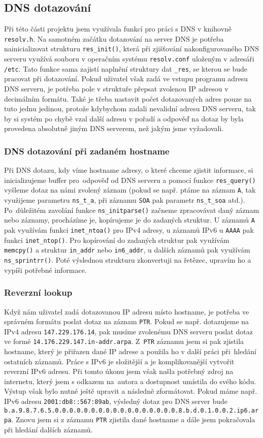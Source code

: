 \documentclass[a4paper, 11pt]{article}
\begin{document}
 \subsection{DNS dotazování}
 Při této části projektu jsem využívala funkcí pro práci s DNS v knihovně \verb|resolv.h|. Na samotném začátku dotazování na server DNS je potřeba nainicializovat strukturu \verb|res_init()|, která při zjišťování nakonfigurovaného DNS serveru využívá souboru v operačním systému \verb|resolv.conf| uloženým v adresáři \verb|/etc|. Tato funkce sama zajistí naplnění struktury dat \verb|_res|, se kterou se bude pracovat při dotazování. 
 Pokud uživatel však zadá ve vstupu programu adresu DNS serveru, je potřeba pole v struktuře přepsat zvolenou IP adresou v decimálním formátu. Také je třeba nastavit počet dotazovaných adres pouze na tuto jednu jedinou, protože kdybychom zadali nevalidní adresu DNS serveru, tak by si systém po chybě vzal další adresu v pořadí a odpověď na dotaz by byla provedena absolutně jiným DNS serverem, než jakým jsme vyžadovali.
 \subsubsection{DNS dotazování při zadaném hostname}
 Při DNS dotazu, kdy víme hostname adresy, o které chceme zjistit informace, si inicializujeme buffer pro~odpověď od DNS serveru a pomocí funkce \verb|res_query()| vyšleme dotaz na námi zvolený záznam (pokud se např. ptáme na záznam \verb|A|, tak využijeme parametru \verb|ns_t_a|, při záznamu \verb|SOA| pak parametr \verb|ns_t_soa| atd.). Po~důležitém zavolání funkce \verb|ns_initparse()| začneme zpracovávat daný záznam nebo záznamy, procházíme je, kopírujeme je do zadaných struktur. U záznamů \verb|A| pak využívám funkci \verb|inet_ntoa()| pro IPv4 adresy, u záznamů IPv6 u \verb|AAAA| pak funkci \verb|inet_ntop()|. Pro kopírování do zadaných struktur pak využívám \verb|memcpy()| a struktur \verb|in_addr| nebo \verb|in6_addr|, u dalších záznamů pak využívám \verb|ns_sprintrr()|. Poté výslednou strukturu zkonvertuji na řetězec, upravím ho a vypíši potřebné informace.
  \subsubsection{Reverzní lookup}
  Když nám uživatel zadá dotazovanou IP adresu místo hostname, je potřeba ve správném formátu poslat dotaz na záznam \verb|PTR|. Pokud se např. dotazujeme na IPv4 adresu \verb|147.229.176.14|, pak musíme zvolenému DNS serveru poslat dotaz ve formě \verb|14.176.229.147.in-addr.arpa|. Z~\verb|PTR| záznamu jsem si pak zjistila hostname, který je přiřazen dané IP adrese a použila ho v další práci při~hledání ostatních záznamů. Práce s IPv6 je složitější a je komplikovanější vytvořit reverzní IPv6 adresu. Při tomto úkonu jsem však našla potřebný zdroj na internetu, který jsem s odkazem na~autora a dostupnost umístila do svého kódu. Výstup však bylo nutné ještě upravit a následně zformátovat. Pokud máme např. IPv6 adresu \verb|2001:db8::567:89ab|, výsledný dotaz pro DNS server bude \verb|b.a.9.8.7.6.5.0.0.0.0.0.0.0.0.0.0.0.0.0.0.0.0.0.8.b.d.0.1.0.0.2.ip6.arpa|.\cite{ReverseDNSlookup:web} Znovu jsem si z záznamu \verb|PTR| zjistila dané hostname a dále jsem pokračovala při hledání dalších záznamů.
\end{document}
